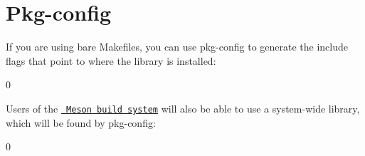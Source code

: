 \chapter{Pkg-\/config}
\hypertarget{md_build_2dt__core_2__deps_2nlohmann__json-src_2docs_2mkdocs_2docs_2integration_2pkg-config}{}\label{md_build_2dt__core_2__deps_2nlohmann__json-src_2docs_2mkdocs_2docs_2integration_2pkg-config}
\label{md_build_2dt__core_2__deps_2nlohmann__json-src_2docs_2mkdocs_2docs_2integration_2pkg-config_autotoc_md1754}%
%
 If you are using bare Makefiles, you can use {\ttfamily pkg-\/config} to generate the include flags that point to where the library is installed\+:


\begin{DoxyCode}{0}

\end{DoxyCode}


Users of the \href{package_managers.md\#meson}{\texttt{ Meson build system}} will also be able to use a system-\/wide library, which will be found by {\ttfamily pkg-\/config}\+:


\begin{DoxyCode}{0}

\end{DoxyCode}
 